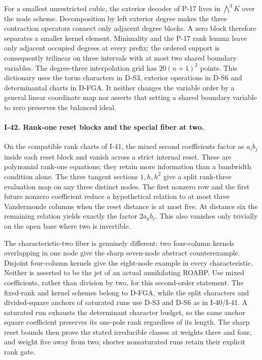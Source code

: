 For a smallest unrestricted cubic, the exterior decoder of P-17
lives in $\bigwedge^3K$ over the node scheme. Decomposition by
left exterior degree makes the three contraction operators
connect only adjacent degree blocks. A zero block therefore
separates a smaller kernel element. Minimality and the P-17
rank lemma leave only adjacent occupied degrees at every
prefix; the ordered support is consequently trilinear on
three intervals with at most two shared boundary variables.
The degree-three interpolation grid has $20(n+1)^2$ points.
This dictionary uses the torus characters in D-S3, exterior
operations in D-S6 and determinantal charts in D-FGA. It neither
changes the variable order by a general linear coordinate map
nor asserts that setting a shared boundary variable to zero
preserves the balanced ideal.

\paragraph{I-42. Rank-one reset blocks and the special fiber at two.}
On the compatible rank charts of I-41, the mixed second
coefficients factor as $a_i b_j$ inside each reset block and
vanish across a strict internal reset. These are polynomial
rank-one equations; they retain more information than a
bandwidth condition alone. The three tangent sections
$1,h,h^2$ give a split rank-three evaluation map on any three
distinct nodes. The first nonzero row and the first future
nonzero coefficient reduce a hypothetical relation to at most
three Vandermonde columns when the reset distance is at most
five. At distance six the remaining relation yields exactly
the factor $2a_kb_\ell$. This also vanishes only trivially on
the open base where two is invertible.

The characteristic-two fiber is genuinely different: two
four-column kernels overlapping in one node give the sharp
seven-node abstract counterexample. Disjoint four-column
kernels give the eight-node example in every characteristic.
Neither is asserted to be the jet of an actual annihilating
ROABP. Use mixed coefficients, rather than division by two,
for this second-order statement. The fixed-rank and kernel
schemes belong to D-FGA, while the split characters and
divided-square anchors of saturated runs use D-S3 and D-S6
as in I-40/I-41. A saturated run exhausts the determinant
character budget, so the same anchor square coefficient
preserves its one-pole rank regardless of its length. The
sharp reset bounds then prove the stated irreducible classes
at weights three and four, and weight five away from two;
shorter nonsaturated runs retain their explicit rank gate.



